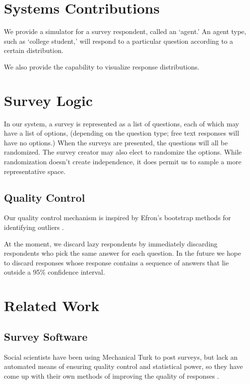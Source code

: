 \documentclass{article}
\begin{document}
\section{Systems Contributions}
We provide a simulator for a survey respondent, called an `agent.' An agent type, such as `college student,' will respond to a particular question according to a certain distribution. %

We also provide the capability to visualize response distributions.

\section{Survey Logic}
In our system, a survey is represented as a list of questions, each of which may have a list of options, (depending on the question type; free text responses will have no options.) When the surveys are presented, the questions will all be randomized. The survey creator may also elect to randomize the options. While randomization doesn't create independence, it does permit us to sample a more representative space.
	

\subsection{Quality Control}
Our quality control mechanism is inspired by Efron's bootstrap methods for identifying outliers \cite{bootstrap}.

At the moment, we discard lazy respondents by immediately discarding respondents who pick the same answer for each question. In the future we hope to discard responses whose response contains a sequence of answers that lie outside a 95\% confidence interval. %
\section{Related Work}
\subsection{Survey Software}
Social scientists have been using Mechanical Turk to post surveys, but lack an automated means of ensuring quality control and statistical power, so they have come up with their own methods of improving the quality of responses \cite{mturk_guide}.
\end{document}
